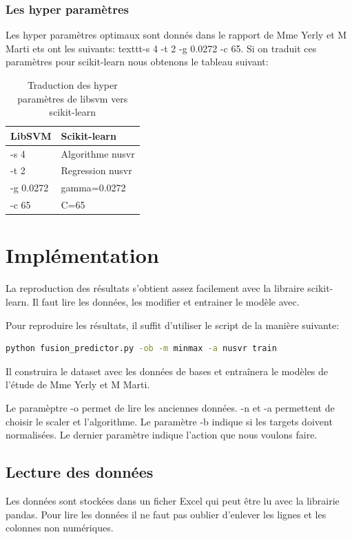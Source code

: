 \subsubsection{Les hyper paramètres}
Les hyper paramètres optimaux sont donnés dans le rapport\cite{IL_SVM_report} de Mme Yerly et M Marti ets ont les suivants: texttt{-s 4 -t 2 -g 0.0272 -c 65}.
Si on traduit ces paramètres pour scikit-learn nous obtenons le tableau suivant:
\begin{table}[ht]
    \centering
    \begin{tabular}{|l|l|}
    \hline
    \textbf{LibSVM} & \textbf{Scikit-learn} \\ \hline
    -s 4            & Algorithme \acrshort{nusvr}      \\ \hline
    -t 2            & Regression \acrshort{nusvr}    \\ \hline
    -g 0.0272       & gamma=0.0272          \\ \hline
    -c 65           & C=65                  \\ \hline
    \end{tabular}
    \caption{Traduction des hyper paramètres de libsvm vers scikit-learn}
\end{table}


\section{Implémentation}
La reproduction des résultats s'obtient assez facilement avec la libraire scikit-learn\cite{scikit-learn}.
Il faut lire les données, les modifier et entrainer le modèle avec.

Pour reproduire les résultats, il suffit d'utiliser le script\cite{fusion_perdictor} de la manière suivante:
\begin{lstlisting}[language=bash]
    python fusion_predictor.py -ob -m minmax -a nusvr train
\end{lstlisting}
Il construira le dataset avec les données de bases et entraînera le modèles de l'étude de Mme Yerly et M Marti.

Le paramèptre -o permet de lire les anciennes données.
-n et -a permettent de choisir le scaler et l'algorithme.
Le paramètre -b indique si les targets doivent normalisées.
Le dernier paramètre indique l'action que nous voulons faire.

\subsection{Lecture des données}
Les données sont stockées dans un ficher Excel qui peut être lu avec la librairie \acrfull{pandas}.
Pour lire les données il ne faut pas oublier d'enlever les lignes et les colonnes non numériques.

